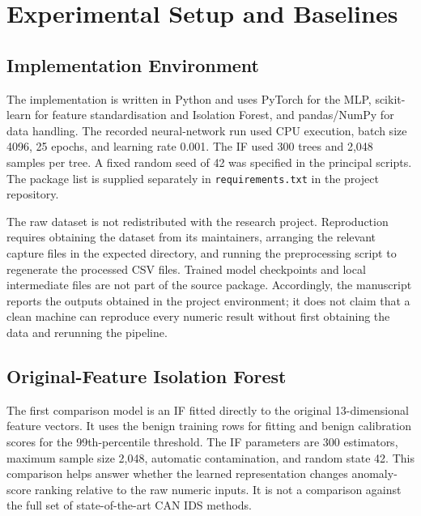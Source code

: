 \documentclass[journal]{IEEEtran}
\begin{document}
\section{Experimental Setup and Baselines}
\subsection{Implementation Environment}
The implementation is written in Python and uses PyTorch for the MLP, scikit-learn for feature standardisation and Isolation Forest, and pandas/NumPy for data handling. The recorded neural-network run used CPU execution, batch size 4096, 25 epochs, and learning rate 0.001. The IF used 300 trees and 2,048 samples per tree. A fixed random seed of 42 was specified in the principal scripts. The package list is supplied separately in \texttt{requirements.txt} in the project repository.

The raw dataset is not redistributed with the research project. Reproduction requires obtaining the dataset from its maintainers, arranging the relevant capture files in the expected directory, and running the preprocessing script to regenerate the processed CSV files. Trained model checkpoints and local intermediate files are not part of the source package. Accordingly, the manuscript reports the outputs obtained in the project environment; it does not claim that a clean machine can reproduce every numeric result without first obtaining the data and rerunning the pipeline.

\subsection{Original-Feature Isolation Forest}
The first comparison model is an IF fitted directly to the original 13-dimensional feature vectors. It uses the benign training rows for fitting and benign calibration scores for the 99th-percentile threshold. The IF parameters are 300 estimators, maximum sample size 2,048, automatic contamination, and random state 42. This comparison helps answer whether the learned representation changes anomaly-score ranking relative to the raw numeric inputs. It is not a comparison against the full set of state-of-the-art CAN IDS methods.
\end{document}
